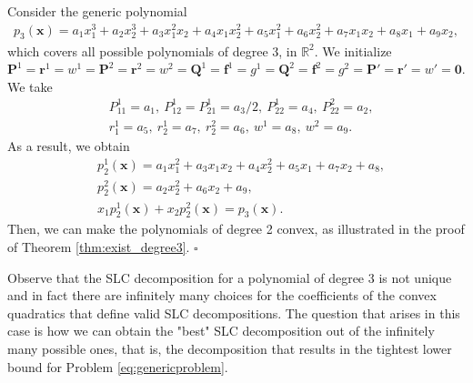 \documentclass[opre,nonblindrev]{informs3} %
\begin{document}
\begin{example}
Consider the generic polynomial 
\begin{align*}
    p_3(\boldsymbol{x}) = a_1 x_1^3 + a_2 x_2^3 + a_3 x_1^2 x_2 + a_4 x_1 x_2^2 + a_5 x_1^2 + a_6 x_2^2 + a_7 x_1 x_2 + a_8 x_1 + a_9 x_2,
\end{align*}  
which covers all possible polynomials of degree 3, in $\mathbb{R}^2$. We initialize $\boldsymbol{P}^1 = \boldsymbol{r}^1 = w^1 = \boldsymbol{P}^2 = \boldsymbol{r}^2 = w^2 = \boldsymbol{Q}^1 = \boldsymbol{f}^1 = g^1 = \boldsymbol{Q}^2 = \boldsymbol{f}^2 = g^2 = \boldsymbol{P}' = \boldsymbol{r}' = w' = \boldsymbol{0}$.
We take 
\begin{align*}
    & P_{11}^1 = a_1, \: P_{12}^1 = P_{21}^1 = a_3/2, \: P_{22}^1 = a_4, \: P_{22}^2 = a_2, \\ 
    & r_{1}^1 = a_5, \: r_{2}^1 = a_7, \: r_{2}^2 = a_6, \: w^1 = a_8, \: w^2 = a_9.
\end{align*}   
As a result, we obtain
\begin{align*}
  & p_2^1(\boldsymbol{x}) = a_1 x_1^2 + a_3 x_1 x_2 + a_4 x_2^2 + a_5 x_1 + a_7 x_2 + a_8, \\ 
  & p_2^2(\boldsymbol{x}) = a_2 x_2^2 + a_6 x_2 + a_9, \\ 
  & x_1 p_2^1(\boldsymbol{x}) + x_2 p_2^2(\boldsymbol{x}) = p_3(\boldsymbol{x}).  
\end{align*}  
Then, we can make the polynomials of degree 2 convex, as illustrated in the proof of Theorem \ref{thm:exist_degree3}. \hfill $\square$ 
\end{example} 

Observe that the SLC decomposition for a polynomial of degree 3 is not unique and in fact there are infinitely many choices for the coefficients of the convex quadratics that define valid SLC decompositions. The question that arises in this case is how we can obtain the "best" SLC decomposition out of the infinitely many possible ones, that is, the decomposition that results in the tightest lower bound for Problem \eqref{eq:genericproblem}.
\end{document}
